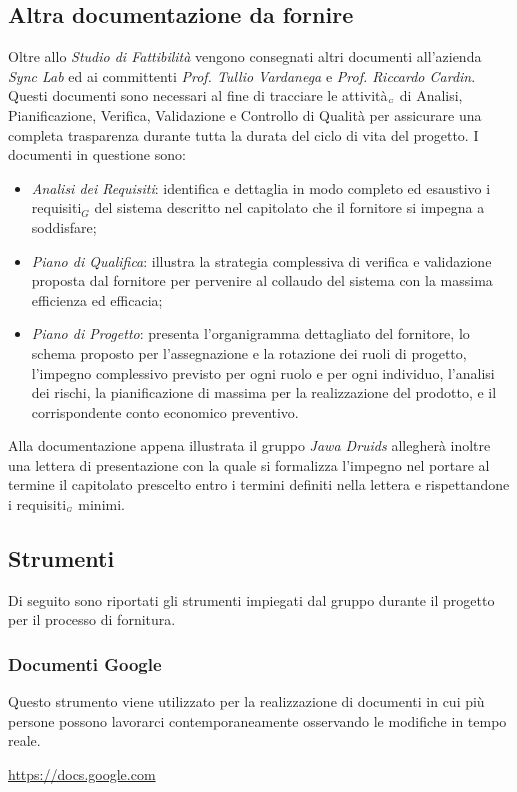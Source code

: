 \subsection{Altra documentazione da fornire}\label{ProcessiPrimariFornituraAltraDocumentazioneDaFornire}
Oltre allo \textit{Studio di Fattibilità} vengono consegnati altri documenti all'azienda \textit{Sync Lab} ed ai committenti \textit{Prof. Tullio Vardanega} e \textit{Prof. Riccardo Cardin}. Questi documenti sono necessari al fine di tracciare le attività$_{\scaleto{G}{3pt}}$ di Analisi, Pianificazione, Verifica, Validazione e Controllo di Qualità per assicurare una completa trasparenza durante tutta la durata del ciclo di vita del progetto.
I documenti in questione sono:
\begin{itemize}
	\item \textit{Analisi dei Requisiti}: identifica e dettaglia in modo completo ed esaustivo i requisiti$_G$ del sistema descritto nel capitolato che il fornitore si impegna a soddisfare;
	\item \textit{Piano di Qualifica}: illustra la strategia complessiva di verifica e validazione proposta dal fornitore per pervenire al collaudo del sistema con la massima efficienza ed efficacia;
	\item \textit{Piano di Progetto}: presenta l'organigramma dettagliato del fornitore, lo schema proposto per l'assegnazione e la rotazione dei ruoli di progetto, l'impegno complessivo previsto per ogni ruolo e per ogni individuo, l'analisi dei rischi, la pianificazione di massima per la realizzazione del prodotto, e il corrispondente conto economico preventivo.
\end{itemize} 
Alla documentazione appena illustrata il gruppo \textit{Jawa Druids} allegherà inoltre una lettera di presentazione con la quale si formalizza l'impegno nel portare al termine il capitolato prescelto entro i termini definiti nella lettera e rispettandone i requisiti$_{\scaleto{G}{3pt}}$ minimi.
\subsection{Strumenti}\label{ProcessiPrimariFornituraStrumenti}
Di seguito sono riportati gli strumenti impiegati dal gruppo durante il progetto per il processo di fornitura.
\subsubsection{Documenti Google}\label{ProcessiPrimariFornituraStrumentiDocumentiGoogle}
Questo strumento viene utilizzato per la realizzazione di documenti in cui più persone possono lavorarci contemporaneamente osservando le modifiche in tempo reale. 
\begin{center}
	\url{https://docs.google.com}
\end{center}

